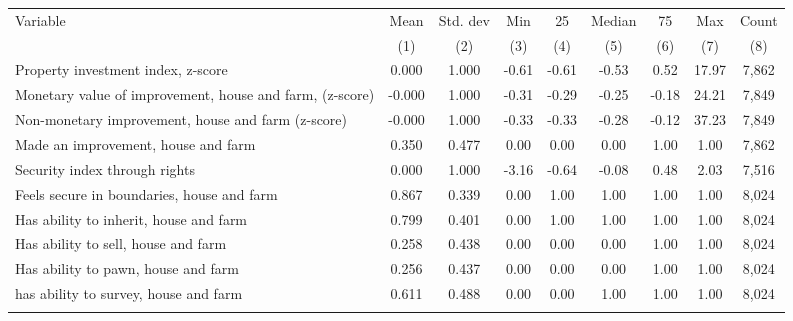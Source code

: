 \begin{tabular}{lcccccccc}
\hline \noalign{\smallskip}Variable & Mean & Std. dev & Min & 25 & Median & 75 & Max & Count\\
 & (1) & (2) & (3) & (4) & (5) & (6) & (7) & (8)\\
\noalign{\smallskip}\hline \noalign{\smallskip}Property investment index, z-score & 0.000 & 1.000 & -0.61 & -0.61 & -0.53 & 0.52 & 17.97 & 7,862\\
\quad Monetary value of improvement, house and farm, (z-score) & -0.000 & 1.000 & -0.31 & -0.29 & -0.25 & -0.18 & 24.21 & 7,849\\
\quad Non-monetary improvement, house and farm (z-score) & -0.000 & 1.000 & -0.33 & -0.33 & -0.28 & -0.12 & 37.23 & 7,849\\
\quad Made an improvement, house and farm & 0.350 & 0.477 & 0.00 & 0.00 & 0.00 & 1.00 & 1.00 & 7,862\\
Security index through rights & 0.000 & 1.000 & -3.16 & -0.64 & -0.08 & 0.48 & 2.03 & 7,516\\
\quad Feels secure in boundaries, house and farm & 0.867 & 0.339 & 0.00 & 1.00 & 1.00 & 1.00 & 1.00 & 8,024\\
\quad Has ability to inherit, house and farm & 0.799 & 0.401 & 0.00 & 1.00 & 1.00 & 1.00 & 1.00 & 8,024\\
\quad Has ability to sell, house and farm & 0.258 & 0.438 & 0.00 & 0.00 & 0.00 & 1.00 & 1.00 & 8,024\\
\quad Has ability to pawn, house and farm & 0.256 & 0.437 & 0.00 & 0.00 & 0.00 & 1.00 & 1.00 & 8,024\\
\quad has ability to survey, house and farm & 0.611 & 0.488 & 0.00 & 0.00 & 1.00 & 1.00 & 1.00 & 8,024\\
\noalign{\smallskip}\hline\end{tabular}
